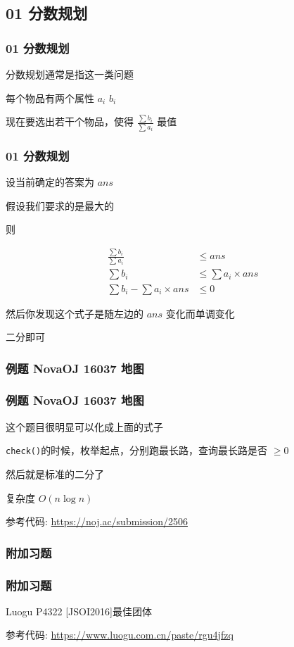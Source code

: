 \documentclass[10pt]{beamer}
\begin{document}
	\subsection{ 01 分数规划 }
	\begin{frame}
		\frametitle{01 分数规划}
		分数规划通常是指这一类问题

		每个物品有两个属性 $a_i$ $b_i$

		现在要选出若干个物品，使得 $\frac{\sum{b_i}}{\sum{a_i}}$ 最值
	\end{frame}

	\begin{frame}
		\frametitle{01 分数规划}
		设当前确定的答案为 $ans$
		
		假设我们要求的是最大的

		则

		\pause

		\begin{align}
			\nonumber
			\frac{\sum{b_i}}{\sum{a_i}} & \leq ans \\
			\nonumber
			\sum{b_i} & \leq \sum{a_i} \times ans \\
			\nonumber
			\sum{b_i} - \sum{a_i} \times ans  & \leq 0
		\end{align}

		\pause

		然后你发现这个式子是随左边的 $ans$ 变化而单调变化

		\pause

		二分即可
	\end{frame}

	\subsubsection{例题 NovaOJ 16037 地图}
	\begin{frame}
		\frametitle{例题 NovaOJ 16037 地图}
		这个题目很明显可以化成上面的式子

		\pause

		\texttt{check()}的时候，枚举起点，分别跑最长路，查询最长路是否 $ \geq 0 $ 

		然后就是标准的二分了

		复杂度 $ O( n \log n ) $

		\pause

		参考代码: \href{https://noj.ac/submission/2506}{https://noj.ac/submission/2506}
	\end{frame}
	\subsubsection{附加习题}
	\begin{frame}
		\frametitle{附加习题}

		Luogu P4322 [JSOI2016]最佳团体

		参考代码: \href{https://www.luogu.com.cn/paste/rgu4jfzq}{https://www.luogu.com.cn/paste/rgu4jfzq}
	\end{frame}
\end{document}
